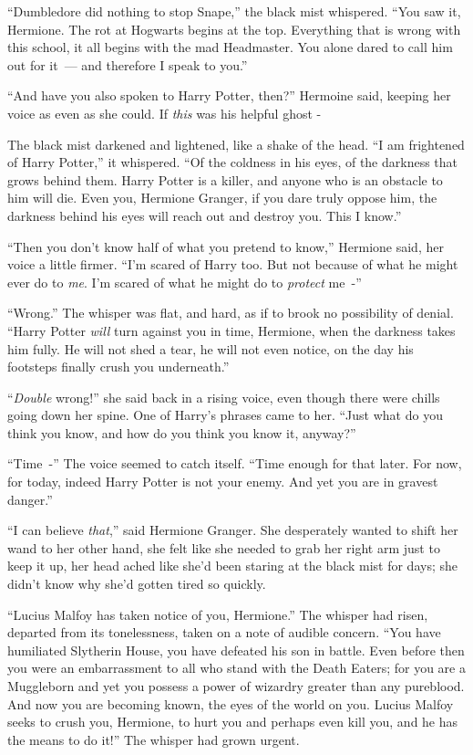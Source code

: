 ``Dumbledore did nothing to stop Snape,'' the black mist whispered. ``You saw it, Hermione. The rot at Hogwarts begins at the top. Everything that is wrong with this school, it all begins with the mad Headmaster. You alone dared to call him out for it~--- and therefore I speak to you.''

``And have you also spoken to Harry Potter, then?'' Hermoine said, keeping her voice as even as she could. If \emph{this} was his helpful ghost -

The black mist darkened and lightened, like a shake of the head. ``I am frightened of Harry Potter,'' it whispered. ``Of the coldness in his eyes, of the darkness that grows behind them. Harry Potter is a killer, and anyone who is an obstacle to him will die. Even you, Hermione Granger, if you dare truly oppose him, the darkness behind his eyes will reach out and destroy you. This I know.''

``Then you don't know half of what you pretend to know,'' Hermione said, her voice a little firmer. ``I'm scared of Harry too. But not because of what he might ever do to \emph{me}. I'm scared of what he might do to \emph{protect} me~-''

``Wrong.'' The whisper was flat, and hard, as if to brook no possibility of denial. ``Harry Potter \emph{will} turn against you in time, Hermione, when the darkness takes him fully. He will not shed a tear, he will not even notice, on the day his footsteps finally crush you underneath.''

``\emph{Double} wrong!'' she said back in a rising voice, even though there were chills going down her spine. One of Harry's phrases came to her. ``Just what do you think you know, and how do you think you know it, anyway?''

``Time~-'' The voice seemed to catch itself. ``Time enough for that later. For now, for today, indeed Harry Potter is not your enemy. And yet you are in gravest danger.''

``I can believe \emph{that},'' said Hermione Granger. She desperately wanted to shift her wand to her other hand, she felt like she needed to grab her right arm just to keep it up, her head ached like she'd been staring at the black mist for days; she didn't know why she'd gotten tired so quickly.

``Lucius Malfoy has taken notice of you, Hermione.'' The whisper had risen, departed from its tonelessness, taken on a note of audible concern. ``You have humiliated Slytherin House, you have defeated his son in battle. Even before then you were an embarrassment to all who stand with the Death Eaters; for you are a Muggleborn and yet you possess a power of wizardry greater than any pureblood. And now you are becoming known, the eyes of the world on you. Lucius Malfoy seeks to crush you, Hermione, to hurt you and perhaps even kill you, and he has the means to do it!'' The whisper had grown urgent.

